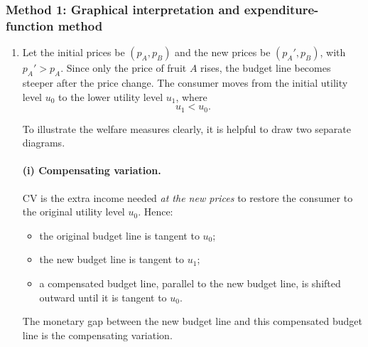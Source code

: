 \documentclass[12pt]{article}
\begin{document}
\subsubsection{Method 1: Graphical interpretation and expenditure-function method}
\begin{enumerate}[label=(\alph*)]
    \item
Let the initial prices be \((p_A,p_B)\) and the new prices be \((p_A',p_B)\), with \(p_A'>p_A\). Since only the price of fruit \(A\) rises, the budget line becomes steeper after the price change. The consumer moves from the initial utility level \(u_0\) to the lower utility level \(u_1\), where
\[
u_1<u_0.
\]

To illustrate the welfare measures clearly, it is helpful to draw two separate diagrams.

\paragraph{(i) Compensating variation.}
CV is the extra income needed \emph{at the new prices} to restore the consumer to the original utility level \(u_0\). Hence:
\begin{itemize}[leftmargin=*]
    \item the original budget line is tangent to \(u_0\);
    \item the new budget line is tangent to \(u_1\);
    \item a compensated budget line, parallel to the new budget line, is shifted outward until it is tangent to \(u_0\).
\end{itemize}
The monetary gap between the new budget line and this compensated budget line is the compensating variation.

\begin{center}
\end{center}
\end{enumerate}
\end{document}
